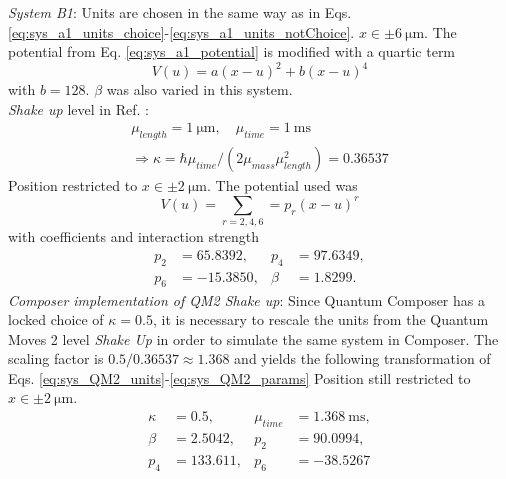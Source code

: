\documentclass[a4paper, twocolumn]{revtex4-1}
\begin{document}
\textit{System B1}: Units are chosen in the same way as in Eqs. \eqref{eq:sys_a1_units_choice}-\eqref{eq:sys_a1_units_notChoice}. $x \in \pm \SI{6}{\micro\meter}$. The potential from Eq. \eqref{eq:sys_a1_potential} is modified with a quartic term
\begin{equation}
	V(u) = a(x-u)^2 + b(x-u)^4
	\label{eq:sys_b1_potential}
\end{equation} 
with $b = 128$. $\beta$ was also varied in this system. \\
\textit{Shake up} level in Ref. \cite{QM2Paper}:
\begin{subequations}\label{eq:sys_QM2_units}
	\begin{gather}
		\mu_{length} = \SI{1}{\micro\meter}, \quad \mu_{time} = \SI{1}{\milli\second} \label{eq:sys_QM2_units_choice}\\
		\Rightarrow \kappa = \hbar \mu_{time} / (2 \mu_{mass} \mu^2_{length}) = 0.36537 \label{eq:sys_QM2_units_notChoice}
	\end{gather}
\end{subequations}
Position restricted to $x \in \pm \SI{2}{\micro\meter}$.
The potential used was
\begin{equation}
	V(u) = \sum\limits_{r = 2,4,6} = p_r (x - u)^r
	\label{eq:sys_QM2_potential}
\end{equation} 
with coefficients and interaction strength \\
\begin{subequations}\label{eq:sys_QM2_params}
	\begin{align}
		p_2& = 65.8392,& p_4& = 97.6349, \\
		p_6& = -15.3850,& \beta& = 1.8299.
	\end{align}
\end{subequations}
\textit{Composer implementation of QM2 Shake up}:
Since Quantum Composer has a locked choice of $\kappa = 0.5$, it is necessary to rescale the units from the Quantum Moves 2 level \textit{Shake Up} in order to simulate the same system in Composer. The scaling factor is $0.5/0.36537 \approx 1.368$ and yields the following transformation of Eqs. \eqref{eq:sys_QM2_units}-\eqref{eq:sys_QM2_params}
Position still restricted to $x \in \pm \SI{2}{\micro\meter}$.
\begin{subequations} \label{eq:sys_compQM2_params}
	\begin{align}
		\kappa& = 0.5,& \mu_{time}& =\SI{1.368}{\milli\second}, \\
		\beta& = 2.5042,& p_2& = 90.0994, \\
		p_4& = 133.611,& p_6 &= -38.5267
	\end{align}
\end{subequations}
\end{document}
